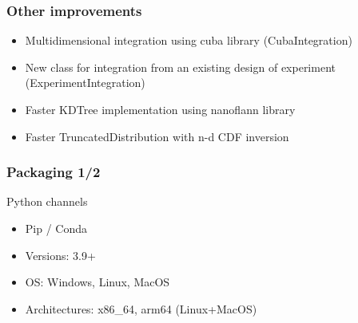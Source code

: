\documentclass[aspectratio=169]{beamer}
\begin{document}

\begin{frame}
\frametitle{Other improvements}
\begin{itemize}
\item Multidimensional integration using cuba library (CubaIntegration)
\item New class for integration from an existing design of experiment (ExperimentIntegration)
\item Faster KDTree implementation using nanoflann library
\item Faster TruncatedDistribution with n-d CDF inversion
\end{itemize}

\vspace{6pt}


\end{frame}


\begin{frame}
\frametitle{Packaging 1/2}
\begin{block}{Python channels}
\begin{itemize}
\item Pip / Conda
\item Versions: 3.9+
\item OS: Windows, Linux, MacOS
\item Architectures: x86\_64, arm64 (Linux+MacOS)
\end{itemize}
\end{block}


\end{frame}
\end{document}
